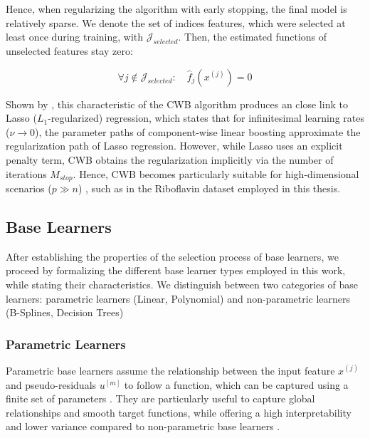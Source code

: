 \documentclass[fontsize=12 pt]{scrartcl}
\begin{document}
Hence, when regularizing the algorithm with early stopping, the final model is relatively sparse. We denote the set of indices features, which were selected at least once during training, with $\mathcal{J}_{selected}$. Then, the estimated functions of unselected features stay zero:

\begin{equation}
    \forall j \notin \mathcal{J}_{selected}: \quad \hat{f}_j(x^{(j)}) = 0
\end{equation}

Shown by \citet{efron2004least}, this characteristic of the CWB algorithm produces an close link to Lasso ($L_1$-regularized) regression, which states that for infinitesimal learning rates ($\nu \to 0$), the parameter paths of component-wise linear boosting approximate the regularization path of Lasso regression. However, while Lasso uses an explicit penalty term, CWB obtains the regularization implicitly via the number of iterations $M_{stop}$. Hence, CWB becomes particularly suitable for high-dimensional scenarios ($p \gg n$) \citep{buhlmann2002boosting}, such as in the Riboflavin dataset employed in this thesis.

\subsection{Base Learners}
\label{sec:base_learners}

After establishing the properties of the selection process of base learners, we proceed by formalizing the different base learner types employed in this work, while stating their characteristics. We distinguish between two categories of base learners: parametric learners (Linear, Polynomial) and non-parametric learners (B-Splines, Decision Trees)

\subsubsection{Parametric Learners}
\label{sec:parametric}


Parametric base learners assume the relationship between the input feature $x^{(j)}$ and pseudo-residuals $u^{[m]}$ to follow a function, which can be captured using a finite set of parameters \citep{hastie2009elements}. They are particularly useful to capture global relationships and smooth target functions, while offering a high interpretability and lower variance compared to non-parametric base learners \citep{buhlmann2003boosting}.
\end{document}
